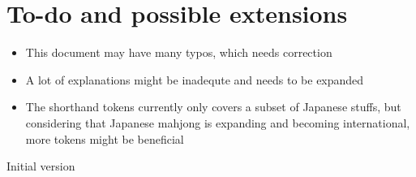 \documentclass[%
	a4paper%
	,10pt%
	,twoside%
	,notitlepage%
]{article}%
\renewcommand*{\DTMdisplaydate}[4]{%
		\ifnum##4>-1{\DTMenglishshortweekdayname{##4}\space}\fi%
		\DTMtwodigits{##3}\space%
		\DTMenglishshortmonthname{##2}\space%
		##1%
	}%
\newcommand*{\github}[1]{\texorpdfstring{\href{https://github.com/#1}{\texttt{#1}}}{#1}}%
\begin{document}
\section{To-do and possible extensions}%
% 
	\begin{itemize}%
		\item{}This document may have many typos, which needs correction%
		\item{}A lot of explanations might be inadequte and needs to be expanded%
		\item{}The shorthand tokens currently only covers a subset of Japanese stuffs, but considering that Japanese mahjong is expanding and becoming international, more tokens might be beneficial%
	\end{itemize}%
\begin{changelog}[%
	section=true%
	,sectioncmd={\section}%
	,title={Changelog}%
	,label={sec:changelog}%
]%
% 
	\begin{version}[%
		version=\currentVer{}%
		,author={\github{ChemistMikeLam}}%
		,date=\releaseDate{}%
		,simple=true%
	]%
		\item{}Initial version%
	\end{version}%
\end{changelog}%
% 
% 
% 
\printindex{}%
% 
\end{document}

